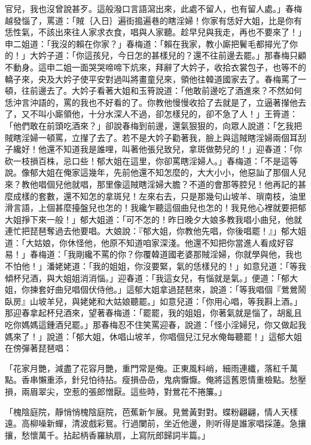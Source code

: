 官兒，我也沒曾說甚歹。這般潑口言語瀉出來，此處不留人，也有留人處。」春梅越發惱了，罵道：「賊｛入日｝遍街搗遍巷的瞎淫婦！你家有恁好大姐，比是你有恁性氣，不該出來往人家求衣食，唱與人家聽。趁早兒與我走，再也不要來了！」申二姐道：「我沒的賴在你家？」春梅道：「賴在我家，教小廝把鬢毛都撏光了你的！」大妗子道：「你這孩兒，今日怎的甚樣兒的？還不往前邊去罷。」那春梅只顧不動身。這申二姐一面哭哭啼啼下炕來，拜辭了大妗子，收拾衣裳包子，也等不的轎子來，央及大妗子使平安對過叫將畫童兒來，領他往韓道國家去了。春梅罵了一頓，往前邊去了。大妗子看著大姐和玉筲說道：「他敢前邊吃了酒進來？不然如何恁沖言沖語的，罵的我也不好看的了。你教他慢慢收拾了去就是了，立逼著攆他去了，又不叫小廝領他，十分水深人不過，卻怎樣兒的，卻不急了人！」王筲道：「他們敢在前頭吃酒來？」卻說春梅到前邊，還氣狠狠的，向眾人說道：「乞我把賊瞎淫婦一頓罵，立攆了去了。若不是大妗子勸著我，臉上與這賊瞎淫婦兩個耳刮子纔好！他還不知道我是誰哩，叫著他張兒致兒，拿斑做勢兒的！」迎春道：「你砍一枝損百株，忌口些！郁大姐在這里，你卻罵瞎淫婦人。」春梅道：「不是這等說。像郁大姐在俺家這幾年，先前他還不知怎麼的，大大小小，他惡訕了那個人兒來？教他唱個兒他就唱，那里像這賊瞎淫婦大膽？不道的會那等腔兒！他再記的甚麼成樣的套數，還不知怎的拿斑兒！左來右去，只是那幾句山坡羊、瑣南枝，油里滑言語，上個甚麼擡盤兒也怎的！我纔乍聽這個曲兒也怎的！我見他心裡就要把郁大姐掙下來一般！」郁大姐道：「可不怎的！昨日晚夕大娘多教我唱小曲兒，他就連忙把琵琶奪過去他要唱。大娘說：『郁大姐，你教他先唱，你後唱罷！』」郁大姐道：「大姑娘，你休怪他，他原不知道咱家深淺。他還不知把你當進人看成好容易！」春梅道：「我剛纔不罵的你？你覆韓道國老婆那賊淫婦，你就學與他，我也不怕他！」潘姥姥道：「我的姐姐，你沒要緊，氣的恁樣兒的！」如意兒道：「等我傾杯兒酒，與大姐姐消消惱。」迎春道：「我這女兒，有惱就是氣。」便道：「郁大姐，你揀套好曲兒唱個伏侍他。」這郁大姐拿過琵琶來，說道：「等我唱個『鶯鶯鬧臥房』山坡羊兒，與姥姥和大姑娘聽罷。」如意兒道：「你用心唱，等我斟上酒。」那迎春拿起杯兒酒來，望著春梅道：「罷罷，我的姐姐，你著氣就是惱了，胡亂且吃你媽媽這鍾酒兒罷。」那春梅忍不住笑罵迎春，說道：「怪小淫婦兒，你又做起我媽來了！」說道：「郁大姐，休唱山坡羊，你唱個兒江兒水俺每聽罷！」這郁大姐在傍彈著琵琶唱：

「花家月艷，減盡了花容月艷，重門常是俺。正東風料峭，細雨連纖，落紅千萬點。香串懶重添，針兒怕待拈。瘦損喦喦，鬼病懨懨。俺將這舊恩情重檢點。愁壓損，兩眉翠尖，空惹的張郎憎厭。這些時，對鶯花不捲簾。」

「槐陰庭院，靜悄悄槐陰庭院，芭蕉新乍展。見鶯黃對對。蝶粉翩翩，情人天樣遠。高柳噪新蟬，清波戲彩鴛。行過闌前，坐近他邊，則听得是誰家唱採蓮。急攘攘，愁懷萬千。拈起柄香羅紈扇，上寫阮郎歸詞半篇。」

